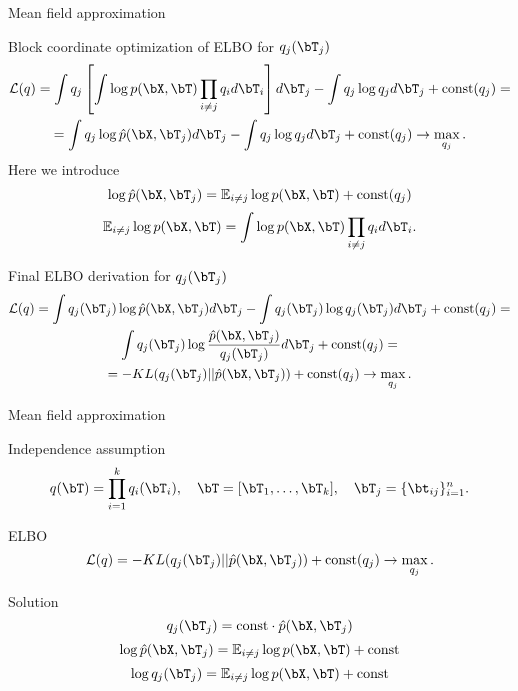 \begin{frame}{Mean field approximation}
	\footnotesize
	\begin{block}{Block coordinate optimization of ELBO for $q_j(\bT_j)$}
		\vspace{-0.4cm}
	    \begin{multline*}
			\mathcal{L} (q) 
			= \int q_j \left[\int \log p(\bX, \bT) \prod_{i \neq j} q_i d \bT_i \right] d \bT_j
			- \int q_j \log q_j  d\bT_j + \text{const}(q_j) = \\
			= \int q_j \log \hat{p}(\bX, \bT_j) d \bT_j 
			- \int q_j \log q_j d\bT_j + \text{const}(q_j) \rightarrow \max_{q_j}.
		\end{multline*}
		Here we introduce
		\[
		   \log \hat{p}(\bX, \bT_j) = \mathbb{E}_{i \neq j} \log p(\bX, \bT) + \text{const}(q_j)
		\]
		\[
		    \mathbb{E}_{i \neq j} \log p(\bX, \bT) = \int \log p(\bX, \bT) \prod_{i \neq j} q_i d \bT_i.
		\]
	    \end{block}
	    \vspace{-0.3cm}
	    \begin{block}{Final ELBO derivation for $q_j(\bT_j)$}
	    	\vspace{-0.5cm}
			\begin{multline*}
	    		\mathcal{L} (q)
	    		= \int q_j (\bT_j) \log \hat{p}(\bX, \bT_j) d \bT_j - \int q_j(\bT_j) \log q_j(\bT_j) d\bT_j + \text{const}(q_j) = \\
	    		 \int q_j (\bT_j) \log \frac{\hat{p}(\bX, \bT_j)}{q_j(\bT_j)} d\bT_j + \text{const}(q_j) = \\
	    		= - KL (q_j(\bT_j) || \hat{p}(\bX, \bT_j)) + \text{const}(q_j) \rightarrow \max_{q_j}.
	    	\end{multline*}
	    \end{block}
\end{frame}
\begin{frame}{Mean field approximation}   
	 \begin{block}{Independence assumption}
		\vspace{-0.3cm}
		\[
		q(\bT) = \prod_{i=1}^k q_i(\bT_i), \quad \bT = [\bT_1, \dots, \bT_k], \quad \bT_j = \{ \bt_{ij}\}_{i=1}^n.
		\]
		\vspace{-0.3cm}
	\end{block}
	\begin{block}{ELBO}
	    \[
			\mathcal{L} (q) = - KL (q_j(\bT_j) || \hat{p}(\bX, \bT_j))  + \text{const}(q_j) \rightarrow \max_{q_j}.
	    \]
	    \vspace{-0.3cm}
	\end{block}
	 \begin{block}{Solution}
	 	\vspace{-0.3cm}
		 \[
		    q_j(\bT_j) = \text{const} \cdot \hat{p}(\bX, \bT_j)
		 \]
		 \[
		 	\log \hat{p}(\bX, \bT_j) = \mathbb{E}_{i \neq j} \log p(\bX, \bT) + \text{const}
		 \]
		 \[
		     \log q_j(\bT_j) = \mathbb{E}_{i \neq j} \log p(\bX, \bT) + \text{const}
		 \]
		 \vspace{-0.3cm}
	 \end{block}
\end{frame}
